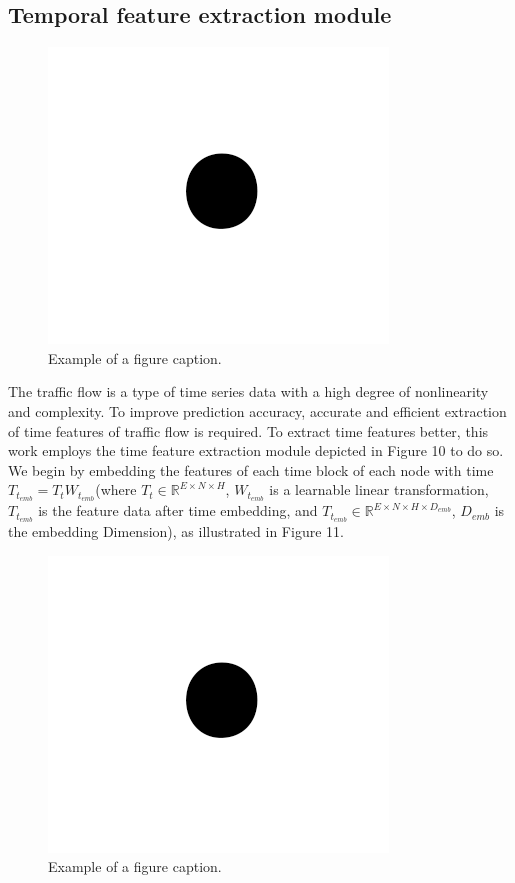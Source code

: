 \documentclass[conference]{IEEEtran}
\begin{document}
\subsection{Temporal feature extraction module}
\begin{figure}[htbp]
    \centerline{\includegraphics{fig1.png}}
    \caption{Example of a figure caption.}
    \label{fig}
\end{figure}
\par
The traffic flow is a type of time series data with a high degree of nonlinearity and complexity. To improve prediction accuracy, accurate and efficient extraction of time features of traffic flow is required. To extract time features better, this work employs the time feature extraction module depicted in Figure 10 to do so. We begin by embedding the features of each time block of each node with time $T_{t_{emb}} = T_tW_{t_{emb}} $(where $T_t \in \mathbb{R} ^ {E \times N \times H}$, $W_{t_{emb}}$ is a learnable linear transformation, $T_{t_{emb}}$ is the feature data after time embedding, and $ T_{t_{emb}} \in \mathbb{R} ^{E \times N \times H \times D_{emb}}$, $D_{emb}$ is the embedding Dimension), as illustrated in Figure 11.
\begin{figure}[htbp]
    \centerline{\includegraphics{fig1.png}}
    \caption{Example of a figure caption.}
    \label{fig}
\end{figure}
\end{document}
